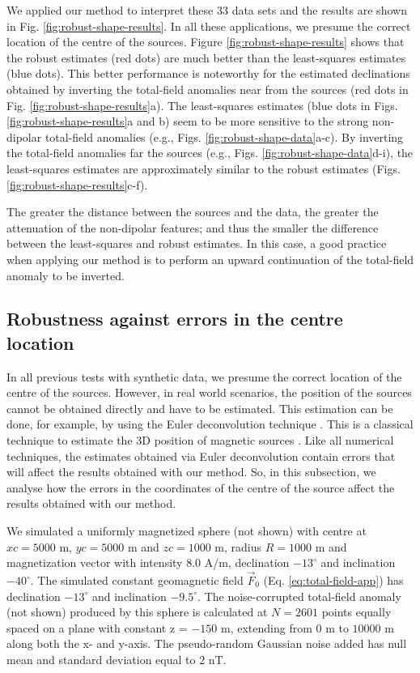 \documentclass[journal abbreviation, npg]{copernicus}
\begin{document}
We applied our method to interpret these 33 data sets and the results are shown in Fig. \ref{fig:robust-shape-results}. In all these applications, we presume the correct location of the centre of the sources. Figure \ref{fig:robust-shape-results} shows that the robust estimates (red dots) are much better than the least-squares estimates (blue dots). This better performance is noteworthy for the estimated declinations obtained by inverting the total-field anomalies near from the sources (red dots in Fig. \ref{fig:robust-shape-results}a). The least-squares estimates (blue dots in Figs. \ref{fig:robust-shape-results}a and b) seem to be more sensitive to the strong non-dipolar total-field anomalies (e.g., Figs. \ref{fig:robust-shape-data}a-c). By inverting the total-field anomalies far the sources (e.g., Figs. \ref{fig:robust-shape-data}d-i), the least-squares estimates are approximately similar to the robust estimates (Figs. \ref{fig:robust-shape-results}c-f).

The greater the distance between the sources and the data, the greater the attenuation of the non-dipolar features; and thus the smaller the difference between the least-squares and robust estimates. In this case, a good practice when applying our method is to perform an upward continuation of the total-field anomaly to be inverted.

\subsection{Robustness against errors in the centre location}

In all previous tests with synthetic data, we presume the correct location of the centre of the sources. However, in real world scenarios, the position of the sources cannot be obtained directly and have to be estimated. This estimation can be done, for example, by using the Euler deconvolution technique \citet{thompson1982, reid-etal1990}. This is a classical technique to estimate the 3D position of magnetic sources \citep{reid-etal2014, uieda-etal2014}. Like all numerical techniques, the estimates obtained via Euler deconvolution contain errors that will affect the results obtained with our method. So, in this subsection, we analyse how the errors in the coordinates of the centre of the source affect the results obtained with our method.

We simulated a uniformly magnetized sphere (not shown) with centre at $xc = 5000$ m, $yc = 5000$ m and $zc = 1000$ m, radius $R = 1000$ m and magnetization vector with intensity $8.0$ A/m, declination $-13^{\circ}$ and inclination $-40^{\circ}$. The simulated constant geomagnetic field $\vec{F}_{0}$ (Eq. \ref{eq:total-field-app}) has declination $-13^{\circ}$ and inclination $-9.5^{\circ}$. The noise-corrupted total-field anomaly (not shown) produced by this sphere is calculated at $N = 2601$ points equally spaced on a plane with constant z = $-150$ m, extending from $0$ m to $10000$ m along both the x- and y-axis. The pseudo-random Gaussian noise added has null mean and standard deviation equal to $2$ nT. 
\end{document}
